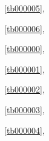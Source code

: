 ﻿



\noindent\tablename\ \ref{tb000005},\dotfill\pageref{tb000005}%

\noindent\tablename\ \ref{tb000006},\dotfill\pageref{tb000006}%

\noindent\tablename\ \ref{tb000000},\dotfill\pageref{tb000000}%

\noindent\tablename\ \ref{tb000001},\dotfill\pageref{tb000001}%

\noindent\tablename\ \ref{tb000002},\dotfill\pageref{tb000002}%

\noindent\tablename\ \ref{tb000003},\dotfill\pageref{tb000003}%

\noindent\tablename\ \ref{tb000004},\dotfill\pageref{tb000004}%









